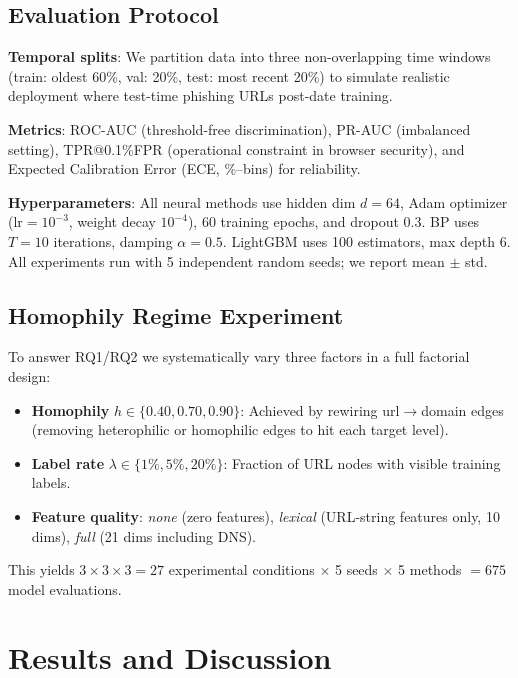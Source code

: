 \documentclass[conference]{IEEEtran}
\begin{document}
\subsection{Evaluation Protocol}

\textbf{Temporal splits}: We partition data into three non-overlapping time
windows (train: oldest 60\%, val: 20\%, test: most recent 20\%) to simulate
realistic deployment where test-time phishing URLs post-date training.

\textbf{Metrics}: ROC-AUC (threshold-free discrimination), PR-AUC (imbalanced
setting), TPR@0.1\%FPR (operational constraint in browser security), and
Expected Calibration Error (ECE, \%--bins) for reliability.

\textbf{Hyperparameters}: All neural methods use hidden dim $d = 64$, Adam
optimizer ($\text{lr} = 10^{-3}$, weight decay $10^{-4}$), 60 training epochs,
and dropout 0.3. BP uses $T = 10$ iterations, damping $\alpha = 0.5$.
LightGBM uses 100 estimators, max depth 6. All experiments run with 5
independent random seeds; we report mean $\pm$ std.

\subsection{Homophily Regime Experiment}

To answer RQ1/RQ2 we systematically vary three factors in a full factorial
design:
\begin{itemize}
  \item \textbf{Homophily} $h \in \{0.40, 0.70, 0.90\}$: Achieved by
  rewiring url$\to$domain edges (removing heterophilic or homophilic edges
  to hit each target level).
  \item \textbf{Label rate} $\lambda \in \{1\%, 5\%, 20\%\}$: Fraction of
  URL nodes with visible training labels.
  \item \textbf{Feature quality}: \textit{none} (zero features), \textit{lexical}
  (URL-string features only, 10 dims), \textit{full} (21 dims including DNS).
\end{itemize}
This yields $3 \times 3 \times 3 = 27$ experimental conditions $\times$ 5
seeds $\times$ 5 methods $= 675$ model evaluations.

\section{Results and Discussion}
\label{sec:results}
\end{document}
